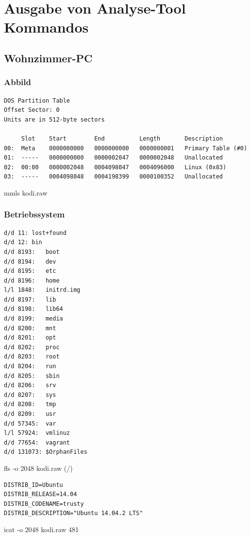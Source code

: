 \section{Ausgabe von Analyse-Tool Kommandos}

\subsection{Wohnzimmer-PC}

\subsubsection{Abbild}

\begin{cmd}[H]
\begin{verbatim}
DOS Partition Table
Offset Sector: 0
Units are in 512-byte sectors

     Slot    Start        End          Length       Description
00:  Meta    0000000000   0000000000   0000000001   Primary Table (#0)
01:  -----   0000000000   0000002047   0000002048   Unallocated
02:  00:00   0000002048   0004098047   0004096000   Linux (0x83)
03:  -----   0004098048   0004198399   0000100352   Unallocated
\end{verbatim}
\caption{mmls kodi.raw}
\label{cmd:kodi-mmls}
\end{cmd}

\subsubsection{Betriebssystem}

\begin{cmd}[H]
\begin{verbatim}
d/d 11:	lost+found
d/d 12:	bin
d/d 8193:	boot
d/d 8194:	dev
d/d 8195:	etc
d/d 8196:	home
l/l 1848:	initrd.img
d/d 8197:	lib
d/d 8198:	lib64
d/d 8199:	media
d/d 8200:	mnt
d/d 8201:	opt
d/d 8202:	proc
d/d 8203:	root
d/d 8204:	run
d/d 8205:	sbin
d/d 8206:	srv
d/d 8207:	sys
d/d 8208:	tmp
d/d 8209:	usr
d/d 57345:	var
l/l 57924:	vmlinuz
d/d 77654:	vagrant
d/d 131073:	$OrphanFiles
\end{verbatim}
\caption{fls -o 2048 kodi.raw (/)}
\label{cmd:kodi-rootdir}
\end{cmd}

\begin{cmd}[H]
\begin{verbatim}
DISTRIB_ID=Ubuntu
DISTRIB_RELEASE=14.04
DISTRIB_CODENAME=trusty
DISTRIB_DESCRIPTION="Ubuntu 14.04.2 LTS"
\end{verbatim}
\caption{icat -o 2048 kodi.raw 481}
\label{cmd:kodi-lsb}
\end{cmd}

